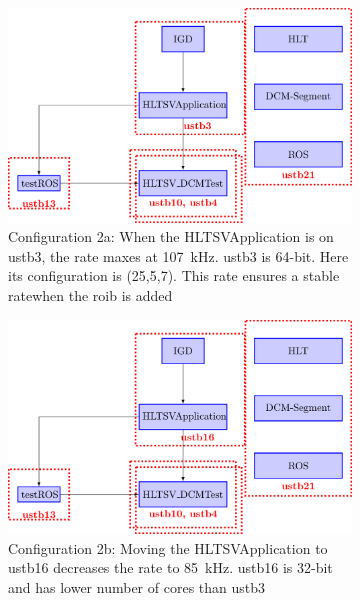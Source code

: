 \begin{figure}
\centering
\begin{subfigure}{0.4\textwidth}
  \includegraphics[width=\textwidth]{figures/confTwoA.png}
  \caption{Configuration 2a: When the HLTSVApplication is on ustb3, 
the rate maxes at 107\ kHz. ustb3 is 64-bit. Here its configuration is (25,5,7). This rate 
ensures a stable ratewhen the \acrshort{roib} is added}
  \label{confTwoABCa}
\end{subfigure}\hspace{0.1\textwidth} %
\begin{subfigure}{0.4\textwidth}
  \includegraphics[width=\textwidth]{figures/confTwoB.png}
  \caption{Configuration 2b: Moving the HLTSVApplication to ustb16 decreases the rate to 85\ kHz. ustb16 
is 32-bit and has lower number of cores than ustb3}
  \label{confTwoABCb}
\end{subfigure}\\[1ex]
\begin{subfigure}{0.4\textwidth}

\end{subfigure}
\end{figure}
